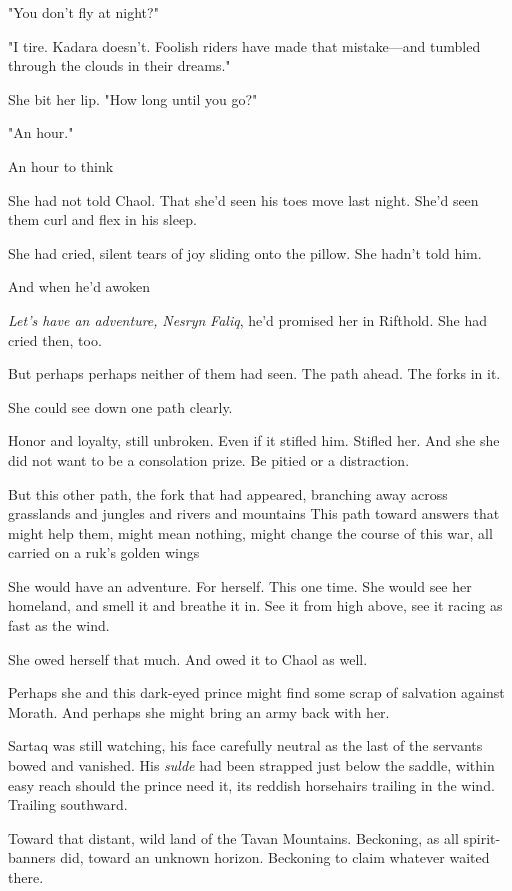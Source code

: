 "You don't fly at night?"

"I tire. Kadara doesn't. Foolish riders have made that mistake---and tumbled through the clouds in their dreams."

She bit her lip. "How long until you go?"

"An hour."

An hour to think 

She had not told Chaol. That she'd seen his toes move last night. She'd seen them curl and flex in his sleep.

She had cried, silent tears of joy sliding onto the pillow. She hadn't told him.

And when he'd awoken 

\emph{Let's have an adventure,} \emph{Nesryn} \emph{Faliq}, he'd promised her in Rifthold. She had cried then, too.

But perhaps  perhaps neither of them had seen. The path ahead. The forks in it.

She could see down one path clearly.

Honor and loyalty, still unbroken. Even if it stifled him. Stifled her. And she  she did not want to be a consolation prize. Be pitied or a distraction.

But this other path, the fork that had appeared, branching away across grasslands and jungles and rivers and mountains  This path toward answers that might help them, might mean nothing, might change the course of this war, all carried on a ruk's golden wings 

She would have an adventure. For herself. This one time. She would see her homeland, and smell it and breathe it in. See it from high above, see it racing as fast as the wind.

She owed herself that much. And owed it to Chaol as well.

Perhaps she and this dark-eyed prince might find some scrap of salvation against Morath. And perhaps she might bring an army back with her.

Sartaq was still watching, his face carefully neutral as the last of the servants bowed and vanished. His \emph{sulde} had been strapped just below the saddle, within easy reach should the prince need it, its reddish horsehairs trailing in the wind. Trailing southward.

Toward that distant, wild land of the Tavan Mountains. Beckoning, as all spirit-banners did, toward an unknown horizon. Beckoning to claim whatever waited there.

